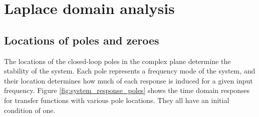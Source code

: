 \section{Laplace domain analysis}

\subsection{Locations of poles and zeroes}

The locations of the closed-loop poles in the complex plane determine the
stability of the \gls{system}. Each pole represents a frequency mode of the
\gls{system}, and their location determines how much of each response is induced
for a given input frequency. Figure \ref{fig:system_response_poles} shows the
time domain responses for transfer functions with various pole locations. They
all have an initial condition of one.

